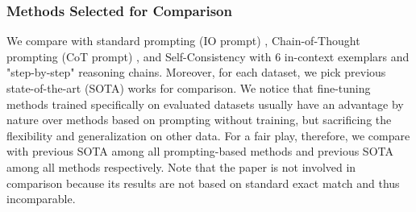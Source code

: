 \documentclass{article} %
\begin{document}
\subsubsection{Methods Selected for Comparison}
\label{sec: baselines}
We compare with standard prompting (IO prompt) \citep{io_prompt}, Chain-of-Thought prompting (CoT prompt) \citep{COT}, and Self-Consistency \citep{self_consistency} with 6 in-context exemplars and "step-by-step" reasoning chains. Moreover, for each dataset, we pick previous state-of-the-art (SOTA) works for comparison. We notice that fine-tuning methods trained specifically on evaluated datasets usually have an advantage by nature over methods based on prompting without training, but sacrificing the flexibility and generalization on other data. For a fair play, therefore, we compare with previous SOTA among all prompting-based methods and previous SOTA among all methods respectively. Note that the paper \citet{LLMKBQA} is not involved in comparison because its results are not based on standard exact match and thus incomparable.
\end{document}
